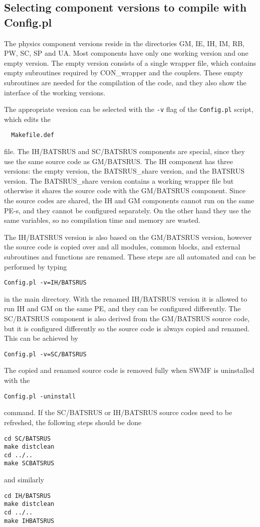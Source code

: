 \subsection{Selecting component versions to compile with Config.pl}

The physics component versions reside in the directories 
GM, IE, IH, IM, RB, PW, SC, SP and UA.
Most components have only one working version and one empty version.
The empty version consists of a single wrapper file, which contains 
empty subroutines required by CON\_wrapper and the couplers.
These empty subroutines are needed for the compilation of the code,
and they also show the interface of the working versions.

The appropriate version can be selected with the {\tt -v} flag
of the {\tt Config.pl} script, which edits the
\begin{verbatim}
  Makefile.def
\end{verbatim}
file. The IH/BATSRUS and SC/BATSRUS components are special, since they use the
same source code as GM/BATSRUS. The IH component has three versions: 
the empty version, the BATSRUS\_share version, and the BATSRUS version. 
The BATSRUS\_share version contains a working wrapper file but otherwise 
it shares the source code
with the GM/BATSRUS component. Since the source codes are shared, the
IH and GM components cannot run on the same PE-s, and they cannot be
configured separately. On the other hand they use the same variables,
so no compilation time and memory are wasted.

The IH/BATSRUS version is also based on the GM/BATSRUS version, however
the source code is copied over and all modules, common blocks,
and external subroutines and functions are renamed. 
These steps are all automated and can be performed by typing
\begin{verbatim}
Config.pl -v=IH/BATSRUS
\end{verbatim}
in the main directory. With the renamed IH/BATSRUS version it is allowed 
to run IH and GM on the same PE, and they can be configured differently.
The SC/BATSRUS component is also derived from the GM/BATSRUS source code,
but it is configured differently so the source code is always copied
and renamed. This can be achieved by
\begin{verbatim}
Config.pl -v=SC/BATSRUS
\end{verbatim}
The copied and renamed source code is removed fully when SWMF is
uninstalled with the
\begin{verbatim}
Config.pl -uninstall
\end{verbatim}
command. If the SC/BATSRUS or IH/BATSRUS source codes need to be
refreshed, the following steps should be done
\begin{verbatim}
cd SC/BATSRUS
make distclean
cd ../..
make SCBATSRUS
\end{verbatim}
and similarly
\begin{verbatim}
cd IH/BATSRUS
make distclean
cd ../..
make IHBATSRUS
\end{verbatim}

